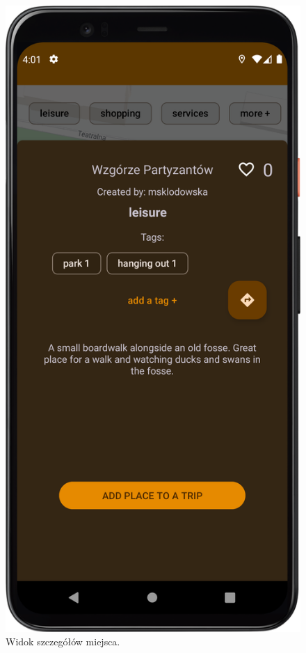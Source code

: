         \vspace{1cm}
        \begin{figure}[H]
            \centering
            \includegraphics[scale=0.10]{src/app/place_viewer.png}
            \caption{Widok szczegółów miejsca.\label{place}}
            \qquad
        \end{figure} 
        \vspace{1cm}


